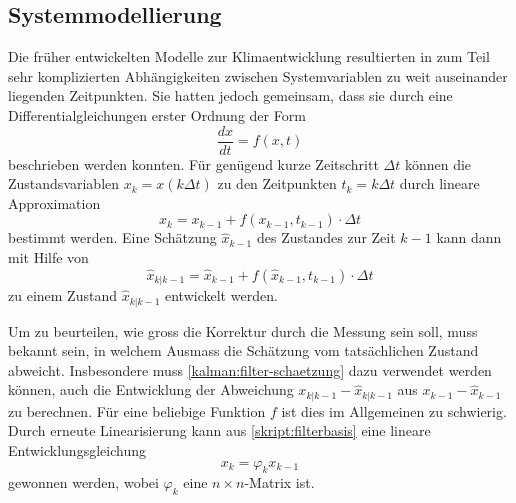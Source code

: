 \subsection{Systemmodellierung\label{subsection:systemmodellierung}}
Die früher entwickelten Modelle zur Klimaentwicklung resultierten in
zum Teil sehr komplizierten Abhängigkeiten zwischen Systemvariablen
zu weit auseinander liegenden Zeitpunkten.
Sie hatten jedoch gemeinsam, dass sie durch eine Differentialgleichungen
erster Ordnung der Form
\[
\frac{dx}{dt} = f(x,t)
\]
beschrieben werden konnten.
Für genügend kurze Zeitschritt $\Delta t$ können die Zustandsvariablen
$x_k = x(k\Delta t)$ zu den Zeitpunkten $t_k=k\Delta t$
durch lineare Approximation
\[
x_k = x_{k-1} + f(x_{k-1}, t_{k-1}) \cdot \Delta t
\]
bestimmt werden.
Eine Schätzung $\hat{x}_{k-1}$ des Zustandes zur Zeit $k-1$ 
kann dann mit Hilfe von
\begin{equation}
\hat{x}_{k|k-1} = \hat{x}_{k-1} + f(\hat{x}_{k-1},t_{k-1})\cdot \Delta t
\label{kalman:filter-schaetzung}
\end{equation}
zu einem Zustand $\hat{x}_{k|k-1}$ entwickelt werden.

Um zu beurteilen, wie gross die Korrektur durch die Messung sein soll,
muss bekannt sein, in welchem Ausmass die Schätzung vom tatsächlichen
Zustand abweicht.
Insbesondere muss \eqref{kalman:filter-schaetzung} dazu verwendet werden
können, auch die Entwicklung der Abweichung $x_{k|k-1}-\hat{x}_{k|k-1}$
aus $x_{k-1} - \hat{x}_{k-1}$ zu berechnen.
Für eine beliebige Funktion $f$ ist dies im Allgemeinen zu schwierig.
Durch erneute Linearisierung kann aus
\eqref{skript:filterbasis} eine lineare Entwicklungsgleichung
\begin{equation}
x_k = \varphi_k x_{k-1}
\end{equation}
gewonnen werden, wobei $\varphi_k$ eine $n\times n$-Matrix ist.

